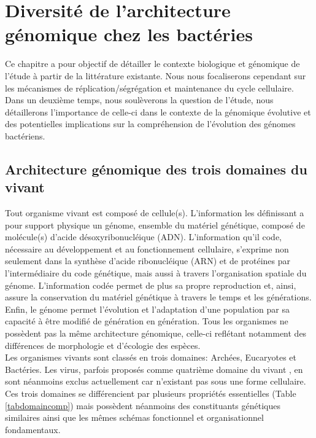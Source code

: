 \chapter{Diversité de l'architecture génomique chez les bactéries}\label{chap1a}


Ce chapitre a pour objectif de détailler le contexte biologique et génomique de l'étude à partir de la littérature existante. Nous nous focaliserons cependant sur les mécanismes de réplication/ségrégation et maintenance du cycle cellulaire. Dans un deuxième temps, nous soulèverons la question de l'étude, nous détaillerons l'importance de celle-ci dans le contexte de la génomique évolutive et des potentielles implications sur la compréhension de l'évolution des génomes bactériens.


\section{Architecture génomique des trois domaines du vivant}
 
Tout organisme vivant est composé de cellule(s). L'information les définissant a pour support physique un génome, ensemble du matériel génétique, composé de molécule(s) d'acide désoxyribonucléique (ADN). L'information qu'il code, nécessaire au développement et au fonctionnement cellulaire, s'exprime non seulement dans la synthèse d'acide ribonucléique (ARN) et de protéines par l'intermédiaire du code génétique, mais aussi à travers l'organisation spatiale du génome. L'information codée permet de plus sa propre reproduction et, ainsi, assure la conservation du matériel génétique à travers le temps et les générations. Enfin, le génome permet l'évolution et l'adaptation d'une population par sa capacité à être modifié de génération en génération. Tous les organismes ne possèdent pas la même architecture génomique, celle-ci reflétant notamment des différences de morphologie et d'écologie des espèces.\\

Les organismes vivants sont classés en trois domaines: Archées, Eucaryotes et Bactéries. Les virus, parfois proposés comme quatrième domaine du vivant \citep{mcgeoch2008extra}, en sont néanmoins exclus actuellement car n'existant pas sous une forme cellulaire. Ces trois domaines se différencient par plusieurs propriétés essentielles (Table \ref{tabdomaincomp}) mais possèdent néanmoins des constituants génétiques similaires ainsi que les mêmes schémas fonctionnel et organisationnel fondamentaux.


